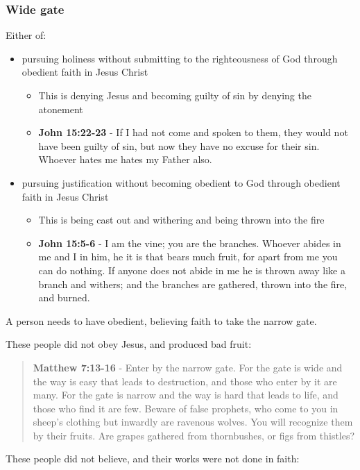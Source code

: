 \documentclass[11pt]{article}
\begin{document}
\subsubsection{Wide gate}
\label{sec:org725c9a0}
Either of:
\begin{itemize}
\item pursuing holiness without submitting to the righteousness of God through obedient faith in Jesus Christ
\begin{itemize}
\item This is denying Jesus and becoming guilty of sin by denying the atonement
\item \textbf{John 15:22-23} - If I had not come and spoken to them, they would not have been guilty of sin, but now they have no excuse for their sin. Whoever hates me hates my Father also.
\end{itemize}
\item pursuing justification without becoming obedient to God through obedient faith in Jesus Christ
\begin{itemize}
\item This is being cast out and withering and being thrown into the fire
\item \textbf{John 15:5-6} - I am the vine; you are the branches. Whoever abides in me and I in him, he it is that bears much fruit, for apart from me you can do nothing. If anyone does not abide in me he is thrown away like a branch and withers; and the branches are gathered, thrown into the fire, and burned.
\end{itemize}
\end{itemize}

A person needs to have obedient, believing faith to take the narrow gate.

These people did not obey Jesus, and produced bad fruit:

\begin{quote}
\textbf{Matthew 7:13-16} - Enter by the narrow gate. For the gate is wide and the way is easy that leads to destruction, and those who enter by it are many. For the gate is narrow and the way is hard that leads to life, and those who find it are few. Beware of false prophets, who come to you in sheep's clothing but inwardly are ravenous wolves. You will recognize them by their fruits. Are grapes gathered from thornbushes, or figs from thistles?
\end{quote}

These people did not believe, and their works were not done in faith:
\end{document}
